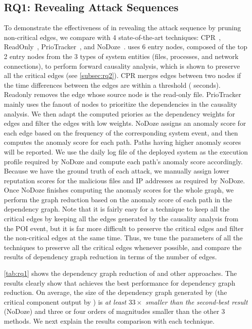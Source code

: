 




\subsection{RQ1: Revealing Attack Sequences}
\label{subsec:rq1}
To demonstrate the effectiveness of \tool in revealing the attack sequence by pruning non-critical edges, we compare \tool with 4 state-of-the-art techniques: CPR~\cite{reduction}, ReadOnly~\cite{loggc}, PrioTracker~\cite{liu2018priotracker}, and NoDoze~\cite{hassan2019nodoze}. 
\tool uses 6 entry nodes, composed of the top 2 entry nodes from the 3 types of system entities (\ie files, processes, and network connections), to perform forward causality analysis, which is shown to preserve all the critical edges (see \cref{subsec:rq2}).
CPR merges edges between two nodes if the time differences between the edges are within a threshold ( seconds).
Readonly removes the edge whose source node is the read-only file. 
PrioTracker mainly uses the fanout of nodes to prioritize the dependencies in the causality analysis. 
We then adapt the computed priories as the dependency weights for edges and filter the edges with low weights.
NoDoze assigns an anomaly score for each edge based on the frequency of the corresponding system event, and then computes the anomaly score for each path. 
Paths having higher anomaly scores will be reported. 
We use the daily log file of the deployed system as the execution profile required by NoDoze and compute each path's anomaly score accordingly. 
Because we have the ground truth of each attack, we manually assign lower reputation scores for the malicious files and IP addresses as required by NoDoze.
Once NoDoze finishes computing the anomaly scores for the whole graph, we perform the graph reduction based on the anomaly score of each path in the dependency graph. 
Note that it is fairly easy for a technique to keep all the critical edges by keeping all the edges generated by the causality analysis from the POI event, but it is far more difficult to preserve the critical edges and filter the non-critical edges at the same time. 
Thus, we tune the parameters of all the techniques to preserve all the critical edges whenever possible, and compare the results of dependency graph reduction in terms of the number of edges.

\cref{tab:rq1} shows the dependency graph reduction of \tool and other approaches.
The results clearly show that \tool achieves the best performance for dependency graph reduction. 
On average, the size of the dependency graph generated by \tool (\ie the critical component output by \tool) is \emph{at least $33\times$ smaller than the second-best result} (\ie NoDoze) and three or four orders of magnitudes smaller than the other 3 methods.
We next explain the results comparison with each technique.

